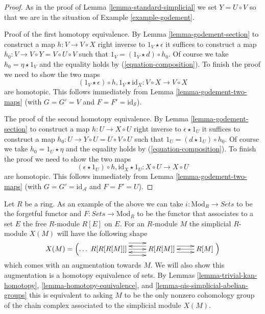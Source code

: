 \begin{proof}
As in the proof of Lemma \ref{lemma-standard-simplicial}
we set $Y = U \circ V$ so that we are
in the situation of Example \ref{example-godement}.

\medskip\noindent
Proof of the first homotopy equivalence. By Lemma \ref{lemma-godement-section}
to construct a map
$h : V \to V \circ X$ right inverse to $1_V \star \epsilon$ it
suffices to construct a map $h_0 : V \to V \circ Y = V \circ U \circ V$
such that $1_V = (1_V \star d) \circ h_0$. Of course we take
$h_0 = \eta \star 1_V$ and the equality holds by (\ref{equation-composition}).
To finish the proof we need to show the two maps
$$
(1_V \star \epsilon) \circ h, 1_V \star \text{id}_X :
V \circ X \longrightarrow V \circ X
$$
are homotopic. This follows immediately from
Lemma \ref{lemma-godement-two-maps} (with
$G = G' = V$ and $F = F' = \text{id}_\mathcal{S}$).

\medskip\noindent
The proof of the second homotopy equivalence. By
Lemma \ref{lemma-godement-section} to construct a map
$h : U \to X \circ U$ right inverse to $\epsilon \star 1_U$ it
suffices to construct a map $h_0 : U \to Y \circ U = U \circ V \circ U$
such that $1_U = (d \star 1_U) \circ h_0$. Of course we take
$h_0 = 1_U \star \eta$ and the equality holds by (\ref{equation-composition}).
To finish the proof we need to show the two maps
$$
(\epsilon \star 1_U) \circ h, \text{id}_X \star 1_U :
X \circ U \longrightarrow X \circ U
$$
are homotopic. This follows immediately from
Lemma \ref{lemma-godement-two-maps} (with
$G = G' = \text{id}_\mathcal{A}$ and $F = F' = U$).
\end{proof}


\begin{example}
\label{example-module}
Let $R$ be a ring. As an example of the above we can take
$i : \text{Mod}_R \to \textit{Sets}$ to be the forgetful functor
and $F : \textit{Sets} \to \text{Mod}_R$ to be the functor that associates
to a set $E$ the free $R$-module $R[E]$ on $E$. For an $R$-module $M$
the simplicial $R$-module $X(M)$ will have the following shape
$$
X(M) =
\left( \ldots
\xymatrix{
R[R[R[M]]]
\ar@<2ex>[r]
\ar@<0ex>[r]
\ar@<-2ex>[r]
&
R[R[M]]
\ar@<1ex>[r]
\ar@<-1ex>[r]
\ar@<1ex>[l]
\ar@<-1ex>[l]
&
R[M]
\ar@<0ex>[l]
}
\right)
$$
which comes with an augmentation towards $M$. We will also show this
augmentation is a homotopy equivalence of sets. By Lemmas
\ref{lemma-trivial-kan-homotopy}, \ref{lemma-homotopy-equivalence}, and
\ref{lemma-qis-simplicial-abelian-groups}
this is equivalent to asking $M$ to be the only nonzero cohomology
group of the chain complex associated to the simplicial module $X(M)$.
\end{example}

